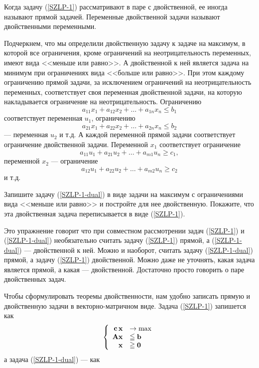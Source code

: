     Когда задачу (\ref{SZLP-1}) рассматривают в паре с двойственной,
    ее иногда называют прямой задачей. Переменные двойственной задачи называют двойственными
    переменными.




    Подчеркнем, что мы определили двойственную задачу к задаче
    на максимум, в которой все ограничения, кроме ограничений
    на неотрицательность переменных, имеют вида <<меньше или равно>>. А
    двойственной к ней является задача на минимум при ограничениях
    вида <<больше или равно>>. При этом каждому ограничению прямой
    задачи, за исключением ограничений на неотрицательность
    переменных, соответствует своя переменная двойственной задачи,
    на которую накладывается ограничение на неотрицательность.
    Ограничению
    \[a_{11} x_1 +  a_{12} x_2 + \ldots + a_{1n} x_n \leqslant b_1  \]
    соответствует переменная $u_1$, ограничению
    \[a_{21} x_1 +  a_{22} x_2 + \ldots + a_{2n} x_n \leqslant b_2\]
    --- переменная $u_2$ и т.д. А каждой переменной прямой задачи
    соответствует ограничение двойственной задачи. Переменной
    $x_{1}$ соответствует ограничение
    \[a_{11} u_1 +  a_{21} u_2 + \ldots + a_{m1} u_n \geqslant c_1,\]
    переменной $x_{2}$ --- ограничение
    \[a_{12} u_1 +  a_{22} u_2 + \ldots + a_{m2} u_n \geqslant c_2\]
    и т.д.




\begin{exer}
    Запишите задачу (\ref{SZLP-1-dual}) в виде задачи на максимум
    с ограничениями вида <<меньше или
    равно>> и постройте для нее двойственную. Покажите, что эта
    двойственная задача переписывается в виде (\ref{SZLP-1}).
\end{exer}

    Это упражнение говорит что при совместном рассмотрении задач (\ref{SZLP-1}) и
    (\ref{SZLP-1-dual}) необязательно считать задачу (\ref{SZLP-1}) прямой,
    а (\ref{SZLP-1-dual}) --- двойственной к ней. Можно и наоборот, считать
    задачу (\ref{SZLP-1-dual}) прямой, а задачу (\ref{SZLP-1})
    двойственной. Можно даже не
    уточнять, какая задача является прямой, а какая ---
    двойственной. Достаточно просто говорить о паре двойственных задач.

    Чтобы сформулировать теоремы двойственности, нам удобно записать
    прямую и двойственную задачи в векторно-матричном виде. Задача
    (\ref{SZLP-1}) запишется как
    \begin{equation}\label{SZLPD}
\left\{
\begin{array}{rl}
 \mathbf{c} \, \mathbf{x} & \to \max  \\
 \mathbf{A} \mathbf{x} &\leqq \mathbf{b} \\
 \mathbf{x} &\geqq \mathbf{0}\\
\end{array} \right.
\end{equation}
    а задача (\ref{SZLP-1-dual}) --- как

